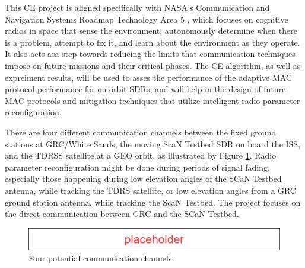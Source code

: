 	\par This CE project is aligned specifically with NASA's Communication and Navigation Systems Roadmap Technology Area 5 \cite{placeholderCitation}, which focuses on cognitive radios in space that sense the environment, autonomously determine when there is a problem, attempt to fix it, and learn about the environment as they operate. It also acts asa step towards reducing the limits that communication techniques impose on future missions and their critical phases. The CE algorithm, as well as expreiment results, will be used to asses the performance of the adaptive MAC protocol performance for on-orbit SDRs, and will help in the design of future MAC protocols and mitigation techniques that utilize intelligent radio parameter reconfiguration. 
	\par There are four different communication channels between the fixed ground stations at GRC/White Sands, the moving ScaN Testbed SDR on board the ISS, and the TDRSS satellite at a GEO orbit, as illustrated by Figure \ref{fig:exampleCommChannels}. Radio parameter reconfiguration might be done during periods of signal fading, especially those happening during low elevation angles of the SCaN Testbed antenna, while tracking the TDRS satellite, or low elevation angles from a GRC ground station antenna, while tracking the ScaN Testbed. The project focuses on the direct communication between GRC and the SCaN Testbed.
	\begin{figure}
		\centering
		\caption{Four potential communication channels.}\label{fig:exampleCommChannels}
		\includegraphics[scale=0.5]{figures/Placeholder.png}
	\end{figure}
